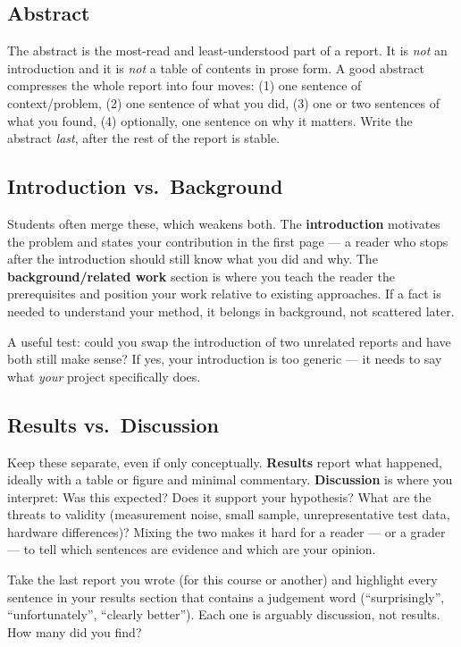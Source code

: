 \subsection{Abstract}
The abstract is the most-read and least-understood part of a report. It
is \emph{not} an introduction and it is \emph{not} a table of contents in
prose form. A good abstract compresses the whole report into four moves:
(1) one sentence of context/problem, (2) one sentence of what you did,
(3) one or two sentences of what you found, (4) optionally, one sentence
on why it matters. Write the abstract \emph{last}, after the rest of the
report is stable.

\subsection{Introduction vs.\ Background}
Students often merge these, which weakens both. The \textbf{introduction}
motivates the problem and states your contribution in the first page ---
a reader who stops after the introduction should still know what you did
and why. The \textbf{background/related work} section is where you teach
the reader the prerequisites and position your work relative to existing
approaches. If a fact is needed to understand your method, it belongs in
background, not scattered later.

\begin{tipbox}
  A useful test: could you swap the introduction of two unrelated reports
  and have both still make sense? If yes, your introduction is too generic
  --- it needs to say what \emph{your} project specifically does.
\end{tipbox}

\subsection{Results vs.\ Discussion}
Keep these separate, even if only conceptually. \textbf{Results} report
what happened, ideally with a table or figure and minimal commentary.
\textbf{Discussion} is where you interpret: Was this expected? Does it
support your hypothesis? What are the threats to validity (measurement
noise, small sample, unrepresentative test data, hardware differences)?
Mixing the two makes it hard for a reader --- or a grader --- to tell
which sentences are evidence and which are your opinion.

\begin{exercisebox}
  Take the last report you wrote (for this course or another) and
  highlight every sentence in your results section that contains a
  judgement word (``surprisingly'', ``unfortunately'', ``clearly better'').
  Each one is arguably discussion, not results. How many did you find?
\end{exercisebox}
